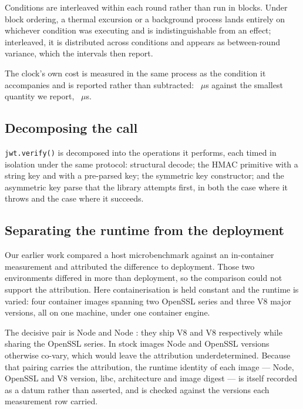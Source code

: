 \documentclass[pdflatex,sn-basic,twocolumn]{sn-jnl}
\begin{document}
Conditions are interleaved within each round rather than run in blocks. Under
block ordering, a thermal excursion or a background process lands entirely on
whichever condition was executing and is indistinguishable from an effect;
interleaved, it is distributed across conditions and appears as between-round
variance, which the intervals then report.

The clock's own cost is measured in the same process as the condition it
accompanies and is reported rather than subtracted: \HostTimerOverhead~$\mu$s
against the smallest quantity we report, \HostCreateSecretKey~$\mu$s.

\subsection{Decomposing the call}

\texttt{jwt.verify()} is decomposed into the operations it performs, each timed
in isolation under the same protocol: structural decode; the HMAC primitive with
a string key and with a pre-parsed key; the symmetric key constructor; and the
asymmetric key parse that the library attempts first, in both the case where it
throws and the case where it succeeds.

\subsection{Separating the runtime from the deployment}

Our earlier work compared a host microbenchmark against an in-container
measurement and attributed the difference to deployment. Those two environments
differed in more than deployment, so the comparison could not support the
attribution. Here containerisation is held constant and the runtime is varied:
four container images spanning two OpenSSL series and three V8 major versions,
all on one machine, under one container engine.

The decisive pair is Node \NodeEighteenNodeMajor{} and Node \NodeTwentyNodeMajor:
they ship V8 \NodeEighteenVeight{} and V8 \NodeTwentyVeight{} respectively while
sharing the OpenSSL \NodeEighteenOpensslSeries{} series. In stock images Node and
OpenSSL versions otherwise co-vary, which would leave the attribution
underdetermined. Because that pairing carries the attribution, the runtime
identity of each image --- Node, OpenSSL and V8 version, libc, architecture and
image digest --- is itself recorded as a datum rather than asserted, and is
checked against the versions each measurement row carried.
\end{document}
